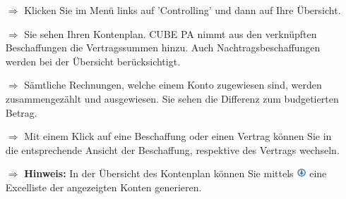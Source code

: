 \documentclass{article}
\begin{document}
\begin{multicols}{2}

\begin{tcolorbox}[colback=blue!5,colframe=blue!40!black,title=Rechnungskontrolle]
\begin{itemize}
  \item[$\Longrightarrow$] Klicken Sie im Menü links auf 'Controlling' und dann auf Ihre Übersicht.
	\item[$\Longrightarrow$] Sie sehen Ihren Kontenplan. CUBE PA nimmt aus den verknüpften Beschaffungen die Vertragssummen hinzu. Auch Nachtragsbeschaffungen werden bei der Übersicht berücksichtigt.
  \item[$\Longrightarrow$] Sämtliche Rechnungen, welche einem Konto zugewiesen sind, werden zusammengezählt und ausgewiesen. Sie sehen die Differenz zum budgetierten Betrag.
  \item[$\Longrightarrow$] Mit einem Klick auf eine Beschaffung oder einen Vertrag können Sie in die entsprechende Ansicht der Beschaffung, respektive des Vertrags wechseln.
  \item[$\Longrightarrow$] \textbf{Hinweis:} In der Übersicht des Kontenplan können Sie mittels \includegraphics[height=10pt]{Icons/ListeGenerieren.png} eine Excelliste der angezeigten Konten generieren.
\end{itemize}
\end{tcolorbox}



\end{multicols}
\end{document}
